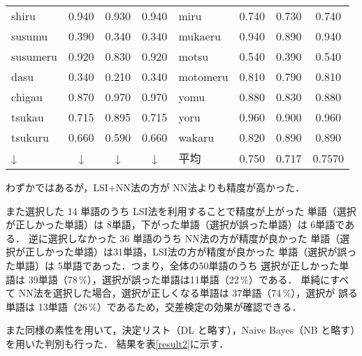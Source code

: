 \begin{table}[htbp]
\begin{center}
\begin{tabular}{|p{}|c|c|c||p{}|c|c|c|}
shiru      & 0.940   & 0.930 & 0.940  &      miru       & 0.740   & 0.730 & 0.740    \\
susumu     & 0.390   & 0.340 & 0.340  &      mukaeru    & 0.940   & 0.890 & 0.940    \\
susumeru   & 0.920   & 0.830 & 0.920  &      motsu      & 0.540   & 0.390 & 0.540    \\
dasu       & 0.340   & 0.210 & 0.340  &      motomeru   & 0.810   & 0.790 & 0.810    \\
chigau     & 0.870   & 0.970 & 0.970  &      yomu       & 0.880   & 0.830 & 0.880    \\
tsukau     & 0.715   & 0.895 & 0.715  &      yoru       & 0.960   & 0.900 & 0.960    \\
tsukuru    & 0.660   & 0.590 & 0.660  &      wakaru     & 0.820   & 0.890 & 0.890    \\ \hline
  ↓  &   ↓    &     ↓     &    ↓       &   平均       &  0.750    & 0.717 & 0.7570    \\ \hline
    \end{tabular}
  \end{center}
\end{table}




わずかではあるが，LSI+NN法の方が NN法よりも精度が高かった．

また選択した 14 単語のうち LSI法を利用することで精度が上がった
単語（選択が正しかった単語）は 8単語，下がった単語（選択が誤った単語）は 6単語である．
逆に選択しなかった 36 単語のうち NN法の方が精度が良かった
単語（選択が正しかった単語）は31単語，LSI法の方が精度が良かった
単語（選択が誤った単語）は 5単語であった．つまり，全体の50単語のうち
選択が正しかった単語は 39単語（78\,\%），選択が誤った単語は11単語（22\,\%）である．
単純にすべて NN法を選択した場合，選択が正しくなる単語は 37単語（74\,\%），選択が
誤る単語は 13単語（26\,\%）であるため，交差検定の効果が確認できる．

また同様の素性を用いて，決定リスト（DL と略す），Naive Bayes（NB と略す）を用いた判別も行った．
結果を\mbox{表\ref{result2}}に示す．

